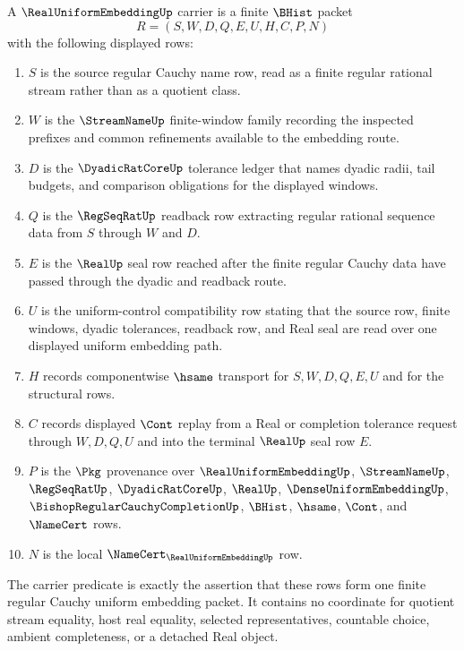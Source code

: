 \begin{definition}
\label{def:real-uniform-embedding-carrier}
A $\RealUniformEmbeddingUp$ carrier is a finite $\BHist$ packet
$$
R=(S,W,D,Q,E,U,H,C,P,N)
$$
with the following displayed rows:
\begin{enumerate}
\item $S$ is the source regular Cauchy name row, read as a finite regular rational stream rather than as a quotient class.
\item $W$ is the $\StreamNameUp$ finite-window family recording the inspected prefixes and common refinements available to the embedding route.
\item $D$ is the $\DyadicRatCoreUp$ tolerance ledger that names dyadic radii, tail budgets, and comparison obligations for the displayed windows.
\item $Q$ is the $\RegSeqRatUp$ readback row extracting regular rational sequence data from $S$ through $W$ and $D$.
\item $E$ is the $\RealUp$ seal row reached after the finite regular Cauchy data have passed through the dyadic and readback route.
\item $U$ is the uniform-control compatibility row stating that the source row, finite windows, dyadic tolerances, readback row, and Real seal are read over one displayed uniform embedding path.
\item $H$ records componentwise $\hsame$ transport for $S,W,D,Q,E,U$ and for the structural rows.
\item $C$ records displayed $\Cont$ replay from a Real or completion tolerance request through $W,D,Q,U$ and into the terminal $\RealUp$ seal row $E$.
\item $P$ is the $\Pkg$ provenance over $\RealUniformEmbeddingUp$, $\StreamNameUp$, $\RegSeqRatUp$, $\DyadicRatCoreUp$, $\RealUp$, $\DenseUniformEmbeddingUp$, $\BishopRegularCauchyCompletionUp$, $\BHist$, $\hsame$, $\Cont$, and $\NameCert$ rows.
\item $N$ is the local $\NameCert_{\RealUniformEmbeddingUp}$ row.
\end{enumerate}
The carrier predicate is exactly the assertion that these rows form one finite regular Cauchy uniform embedding packet. It contains no coordinate for quotient stream equality, host real equality, selected representatives, countable choice, ambient completeness, or a detached Real object.
\end{definition}

